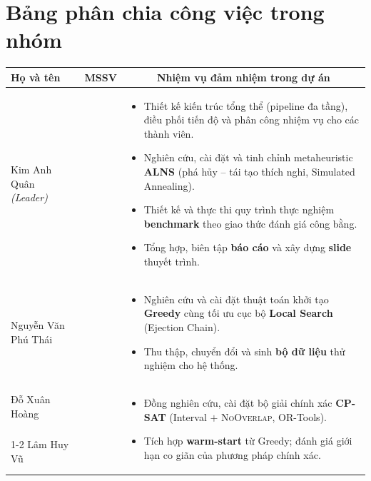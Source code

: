 \documentclass[11pt,a4paper]{article}
\begin{document}
\section*{Bảng phân chia công việc trong nhóm}

\renewcommand{\arraystretch}{1.45}
\noindent
\begin{tabular}{|p{3.0cm}|>{\centering\arraybackslash}p{1.9cm}|p{8.4cm}|}
\hline
\textbf{Họ và tên} & \textbf{MSSV} & \multicolumn{1}{c|}{\textbf{Nhiệm vụ đảm nhiệm trong dự án}} \\
\hline
Kim Anh Quân \newline \textit{(Leader)} & 20232249 &
\begin{itemize}[leftmargin=1.3em, itemsep=2.5pt, topsep=2pt, parsep=0pt]
  \item Thiết kế kiến trúc tổng thể (pipeline đa tầng), điều phối tiến độ và phân
  công nhiệm vụ cho các thành viên.
  \item Nghiên cứu, cài đặt và tinh chỉnh metaheuristic \textbf{ALNS} (phá hủy --
  tái tạo thích nghi, Simulated Annealing).
  \item Thiết kế và thực thi quy trình thực nghiệm \textbf{benchmark} theo giao
  thức đánh giá công bằng.
  \item Tổng hợp, biên tập \textbf{báo cáo} và xây dựng \textbf{slide} thuyết trình.
\end{itemize} \\
\hline
Nguyễn Văn Phú Thái & 20235214 &
\begin{itemize}[leftmargin=1.3em, itemsep=2.5pt, topsep=2pt, parsep=0pt]
  \item Nghiên cứu và cài đặt thuật toán khởi tạo \textbf{Greedy} cùng tối ưu cục
  bộ \textbf{Local Search} (Ejection Chain).
  \item Thu thập, chuyển đổi và sinh \textbf{bộ dữ liệu} thử nghiệm cho hệ thống.
\end{itemize} \\
\hline
Đỗ Xuân Hoàng & 20235084 &
\multirow{2}{8.4cm}{%
\begin{itemize}[leftmargin=1.3em, itemsep=2.5pt, topsep=2pt, parsep=0pt]
  \item Đồng nghiên cứu, cài đặt bộ giải chính xác \textbf{CP-SAT}
  (Interval $+$ \textsc{NoOverlap}, OR-Tools).
  \item Tích hợp \textbf{warm-start} từ Greedy; đánh giá giới hạn co giãn của
  phương pháp chính xác.
\end{itemize}} \\
\cline{1-2}
Lâm Huy Vũ\rule[-1.35cm]{0pt}{0.3cm} & 20225117 & \\
\hline
\end{tabular}
\end{document}
